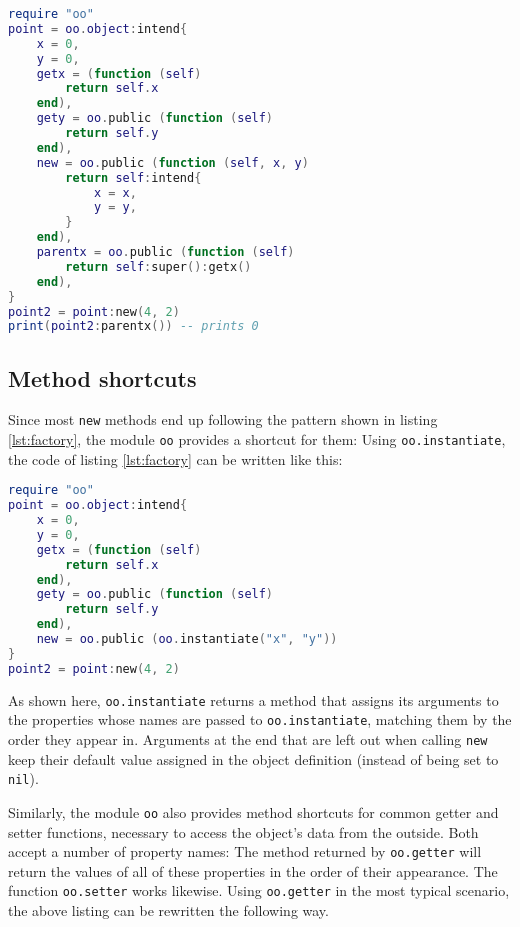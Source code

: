 \begin{lstlisting}[language=lua, caption={Using the \texttt{super} method}, label=lst:super, name=lst:super]
require "oo"
point = oo.object:intend{
	x = 0,
	y = 0,
	getx = (function (self)
		return self.x
	end),
	gety = oo.public (function (self)
		return self.y
	end),
	new = oo.public (function (self, x, y)
		return self:intend{
			x = x,
			y = y,
		}
	end),
	parentx = oo.public (function (self)
		return self:super():getx()
	end),
}
point2 = point:new(4, 2)
print(point2:parentx()) -- prints 0
\end{lstlisting}

\subsection{Method shortcuts}

Since most \texttt{new} methods end up following the pattern shown in listing \ref{lst:factory}, the module \texttt{oo} provides a shortcut for them: Using \texttt{oo.instantiate}, the code of listing \ref{lst:factory} can be written like this:

\begin{lstlisting}[language=lua, caption={Rewriting listing \ref{lst:factory} using \texttt{oo.instantiate}}, label=lst:instantiate, name=lst:instantiate]
require "oo"
point = oo.object:intend{
	x = 0,
	y = 0,
	getx = (function (self)
		return self.x
	end),
	gety = oo.public (function (self)
		return self.y
	end),
	new = oo.public (oo.instantiate("x", "y"))
}
point2 = point:new(4, 2)
\end{lstlisting}

As shown here, \texttt{oo.instantiate} returns a method that assigns its arguments to the properties whose names are passed to \texttt{oo.instantiate}, matching them by the order they appear in. Arguments at the end that are left out when calling \texttt{new} keep their default value assigned in the object definition (instead of being set to \texttt{nil}).

Similarly, the module \texttt{oo} also provides method shortcuts for common getter and setter functions, necessary to access the object's data from the outside. Both accept a number of property names: The method returned by \texttt{oo.getter} will return the values of all of these properties in the order of their appearance. The function \texttt{oo.setter} works likewise. Using \texttt{oo.getter} in the most typical scenario, the above listing can be rewritten the following way.


